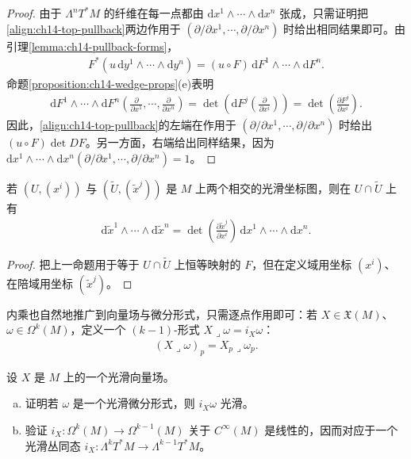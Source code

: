 \documentclass[../../main.tex]{subfiles}
\begin{document}
\begin{proof}
由于 $\Lambda^n T^*M$ 的纤维在每一点都由 $\mathrm{d}x^1\wedge\cdots\wedge\mathrm{d}x^n$ 张成，只需证明把\eqref{align:ch14-top-pullback}两边作用于 $(\partial/\partial x^1,\cdots ,\partial/\partial x^n)$ 时给出相同结果即可。由引理\ref{lemma:ch14-pullback-forms}，
\begin{align*}
F^*(u\,\mathrm{d}y^1\wedge\cdots\wedge\mathrm{d}y^n)
=(u\circ F)\,\mathrm{d}F^1\wedge\cdots\wedge\mathrm{d}F^n.
\end{align*}
命题\ref{proposition:ch14-wedge-props}(e)表明
\begin{align*}
\mathrm{d}F^1\wedge\cdots\wedge\mathrm{d}F^n\left(\frac{\partial}{\partial x^1},\cdots ,\frac{\partial}{\partial x^n}\right)
=\det\left(\mathrm{d}F^j\left(\frac{\partial}{\partial x^i}\right)\right)
=\det\left(\frac{\partial F^j}{\partial x^i}\right).
\end{align*}
因此，\eqref{align:ch14-top-pullback}的左端在作用于 $(\partial/\partial x^1,\cdots ,\partial/\partial x^n)$ 时给出 $(u\circ F)\det DF$。另一方面，右端给出同样结果，因为 $\mathrm{d}x^1\wedge\cdots\wedge\mathrm{d}x^n(\partial/\partial x^1,\cdots ,\partial/\partial x^n)=1$。
\end{proof}

\begin{corollary}\label{corollary:ch14-top-change-coords}
若 $(U,(x^i))$ 与 $(\widetilde U,(\widetilde x^j))$ 是 $M$ 上两个相交的光滑坐标图，则在 $U\cap\widetilde U$ 上有
\begin{align}
\mathrm{d}\widetilde x^1\wedge\cdots\wedge\mathrm{d}\widetilde x^n
=\det\left(\frac{\partial\widetilde x^j}{\partial x^i}\right)\,
\mathrm{d}x^1\wedge\cdots\wedge\mathrm{d}x^n.\label{align:ch14-top-change}
\end{align}
\end{corollary}

\begin{proof}
把上一命题用于等于 $U\cap\widetilde U$ 上恒等映射的 $F$，但在定义域用坐标 $(x^i)$、在陪域用坐标 $(\widetilde x^j)$。
\end{proof}

内乘也自然地推广到向量场与微分形式，只需逐点作用即可：若 $X\in\mathfrak X(M)$、$\omega\in\Omega^k(M)$，定义一个 $(k-1)$-形式 $X\lrcorner\omega=i_X\omega$：
\begin{align*}
(X\lrcorner\omega)_p=X_p\lrcorner\omega_p.
\end{align*}

\begin{exercise}\label{exercise:ch14-22}
设 $X$ 是 $M$ 上的一个光滑向量场。
\begin{enumerate}[(a)]
\item 证明若 $\omega$ 是一个光滑微分形式，则 $i_X\omega$ 光滑。
\item 验证 $i_X:\Omega^k(M)\to\Omega^{k-1}(M)$ 关于 $C^\infty(M)$ 是线性的，因而对应于一个光滑丛同态 $i_X:\Lambda^k T^*M\to\Lambda^{k-1}T^*M$。
\end{enumerate}
\end{exercise}
\end{document}
